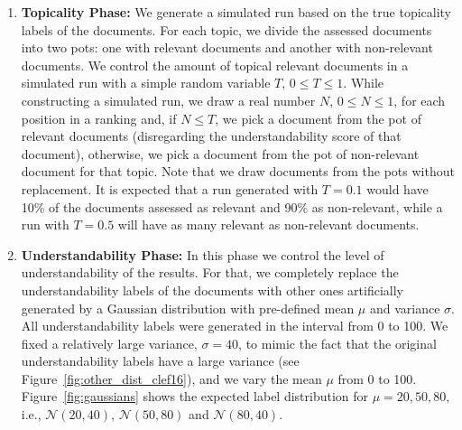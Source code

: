 \begin{enumerate}
\item \textbf{Topicality Phase:} We generate a simulated run based on the true topicality labels of the documents. For each topic, we divide the assessed documents into two pots: one with relevant documents and another with non-relevant documents.    
We control the amount of topical relevant documents in a simulated run with a simple random variable $T$, $0 \le T \le 1$. 
        While constructing a simulated run, we draw a real number $N$, $0 \le N \le 1$, for each position in a ranking and, if $N \le T$, we pick a document from the pot of relevant documents (disregarding the understandability score of that document), otherwise, we pick a document from the pot of non-relevant document for that topic. Note that we draw documents from the pots without replacement. It is expected that a run generated with $T=0.1$ would have 10\% of the documents assessed as relevant and 90\% as non-relevant, while a run with $T=0.5$ will have as many relevant as non-relevant documents. 

    \item \textbf{Understandability Phase:} In this phase we control the level of understandability of the results. For that, we completely replace the understandability labels of the documents with other ones artificially generated by a Gaussian distribution with pre-defined mean $\mu$ and variance $\sigma$. All understandability labels were generated in the interval from 0 to 100. We fixed a relatively large variance, $\sigma=40$, to mimic the fact that the original understandability labels have a large variance (see Figure~\ref{fig:other_dist_clef16}), and we vary the mean $\mu$ from 0 to 100. Figure~\ref{fig:gaussians} shows the expected label distribution for $\mu=20, 50, 80$, i.e., $\mathcal{N}(20, 40)$, $\mathcal{N}(50, 80)$ and $\mathcal{N}(80, 40)$.

\end{enumerate}

